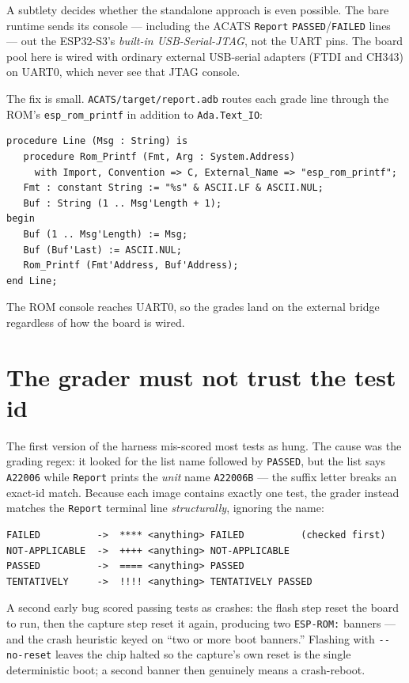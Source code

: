 A subtlety decides whether the standalone approach is even possible. The bare runtime
sends its console --- including the ACATS \texttt{Report} \texttt{PASSED}/\texttt{FAILED}
lines --- out the ESP32-S3's \emph{built-in USB-Serial-JTAG}, not the UART pins. The
board pool here is wired with ordinary external USB-serial adapters (FTDI and CH343)
on UART0, which never see that JTAG console.

The fix is small. \texttt{ACATS/target/report.adb} routes each grade line through the
ROM's \texttt{esp\_rom\_printf} in addition to \texttt{Ada.Text\_IO}:

\begin{lstlisting}
procedure Line (Msg : String) is
   procedure Rom_Printf (Fmt, Arg : System.Address)
     with Import, Convention => C, External_Name => "esp_rom_printf";
   Fmt : constant String := "%s" & ASCII.LF & ASCII.NUL;
   Buf : String (1 .. Msg'Length + 1);
begin
   Buf (1 .. Msg'Length) := Msg;
   Buf (Buf'Last) := ASCII.NUL;
   Rom_Printf (Fmt'Address, Buf'Address);
end Line;
\end{lstlisting}

The ROM console reaches UART0, so the grades land on the external bridge regardless
of how the board is wired.

\section{The grader must not trust the test id}

The first version of the harness mis-scored most tests as hung. The cause was the
grading regex: it looked for the list name followed by \texttt{PASSED}, but the list
says \texttt{A22006} while \texttt{Report} prints the \emph{unit} name \texttt{A22006B}
--- the suffix letter breaks an exact-id match. Because each image contains exactly one
test, the grader instead matches the \texttt{Report} terminal line \emph{structurally},
ignoring the name:

\begin{lstlisting}[style=sh]
FAILED          ->  **** <anything> FAILED          (checked first)
NOT-APPLICABLE  ->  ++++ <anything> NOT-APPLICABLE
PASSED          ->  ==== <anything> PASSED
TENTATIVELY     ->  !!!! <anything> TENTATIVELY PASSED
\end{lstlisting}

A second early bug scored passing tests as crashes: the flash step reset the board to
run, then the capture step reset it again, producing two \texttt{ESP-ROM:} banners ---
and the crash heuristic keyed on ``two or more boot banners.'' Flashing with
\texttt{-{}-no-reset} leaves the chip halted so the capture's own reset is the single
deterministic boot; a second banner then genuinely means a crash-reboot.

